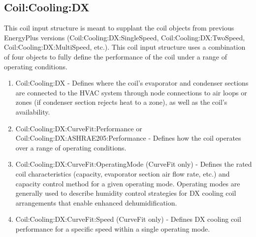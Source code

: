 \subsection{Coil:Cooling:DX}\label{coilcoolingdx}

This coil input structure is meant to supplant the coil objects from previous EnergyPlus versions (Coil:Cooling:DX:SingleSpeed, Coil:Cooling:DX:TwoSpeed, Coil:Cooling:DX:MultiSpeed, etc.). This coil input structure uses a combination of four objects to fully define the performance of the coil under a range of operating conditions.

\begin{enumerate}
\def\labelenumi{\arabic{enumi}.}
\item Coil:Cooling:DX - Defines where the coil's evaporator and condenser sections are connected to the HVAC system through node connections to air loops or zones (if condenser section rejects heat to a zone), as well as the coil's availability.

\item Coil:Cooling:DX:CurveFit:Performance or Coil:Cooling:DX:ASHRAE205:Performance - Defines how the coil operates over a range of operating conditions.

\item Coil:Cooling:DX:CurveFit:OperatingMode (CurveFit only) - Defines the rated coil characteristics (capacity, evaporator section air flow rate, etc.) and capacity control method for a given operating mode. Operating modes are generally used to describe humidity control strategies for DX cooling coil arrangements that enable enhanced dehumidification.

\item Coil:Cooling:DX:CurveFit:Speed  (CurveFit only) - Defines DX cooling coil performance for a specific speed within a single operating mode.
\end{enumerate}
